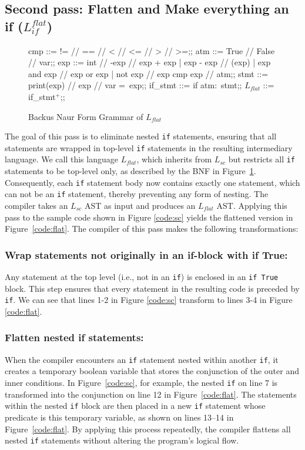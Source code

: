 \subsection{Second pass: Flatten and Make everything an if ($L_{if}^{flat}$)}
\begin{figure}[h!]
	\centering
	\begin{bnf}[row{-} = {bg = gray9}]
		cmp ::= != // == // < // <= // > // >=;;
		atm ::= True // False // var;;
		exp ::= int  // -exp // exp + exp 
		| exp - exp // (exp)
		| exp and exp // exp or exp 
		| not exp // exp cmp exp // atm;;
		stmt ::= print(exp) // exp // var = exp;;
		if\_stmt ::= if atm$\colon$ stmt;;
		$L_{flat}$ ::= if\_stmt$^+$;;
	\end{bnf}
	\caption{Backus Naur Form Grammar of $L_{flat}$}
	\label{bnf:flat}
\end{figure}

The goal of this pass is to eliminate nested \texttt{if} statements, ensuring that all statements are wrapped in top-level \texttt{if} statements in the resulting intermediary language. We call this language $L_{flat}$, which inherits from $L_{sc}$ but restricts all \texttt{if} statements to be top-level only, as described by the BNF in Figure~\ref{bnf:flat}. Consequently, each \texttt{if} statement body now contains exactly one statement, which can not be an \texttt{if} statement, thereby preventing any form of nesting. The compiler takes an $L_{sc}$ AST as input and produces an $L_{flat}$ AST. Applying this pass to the sample code shown in Figure \ref{code:sc} yields the flattened version in Figure~\ref{code:flat}. The compiler of this pass makes the following transformations:

\subsubsection{Wrap statements not originally in an if-block with if True:} Any statement at the top level (i.e., not in an \texttt{if}) is enclosed in an \texttt{if True} block. This step ensures that every statement in the resulting code is preceded by \texttt{if}. We can see that lines 1-2 in Figure \ref{code:sc} transform to lines 3-4 in Figure \ref{code:flat}.

\subsubsection{Flatten nested if statements:}
When the compiler encounters an \texttt{if} statement nested within another \texttt{if}, it creates a temporary boolean variable that stores the conjunction of the outer and inner conditions. In Figure~\ref{code:sc}, for example, the nested \texttt{if} on line 7 is transformed into the conjunction on line 12 in Figure~\ref{code:flat}. The statements within the nested \texttt{if} block are then placed in a new \texttt{if} statement whose predicate is this temporary variable, as shown on lines 13–14 in Figure~\ref{code:flat}. By applying this process repeatedly, the compiler flattens all nested \texttt{if} statements without altering the program’s logical flow.

